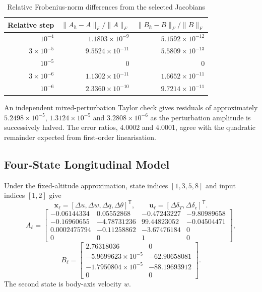 \documentclass[a4paper,11pt]{article}
\newcommand{\de}{\delta_e}
\newcommand{\dt}{\delta_T}
\begin{document}
\begin{table}[H]\centering
\caption{Relative Frobenius-norm differences from the selected Jacobians}
\begin{tabular}{rrr}\toprule
Relative step&$\|A_h-A\|_F/\|A\|_F$&$\|B_h-B\|_F/\|B\|_F$\\\midrule
$10^{-4}$&$1.1803\times10^{-9}$&$5.1592\times10^{-12}$\\
$3\times10^{-5}$&$9.5524\times10^{-11}$&$5.5809\times10^{-13}$\\
$10^{-5}$&$0$&$0$\\
$3\times10^{-6}$&$1.1302\times10^{-11}$&$1.6652\times10^{-11}$\\
$10^{-6}$&$2.3360\times10^{-10}$&$9.7214\times10^{-11}$\\\bottomrule
\end{tabular}
\end{table}
An independent mixed-perturbation Taylor check gives residuals of approximately $5.2498\times10^{-5}$, $1.3124\times10^{-5}$ and $3.2808\times10^{-6}$ as the perturbation amplitude is successively halved. The error ratios, 4.0002 and 4.0001, agree with the quadratic remainder expected from first-order linearisation.

\subsection{Four-State Longitudinal Model}
Under the fixed-altitude approximation, state indices $[1,3,5,8]$ and input indices $[1,2]$ give
\begin{equation}
\bm x_\ell=[\Delta u,\Delta w,\Delta q,\Delta\theta]^{\mathsf T},\qquad
\bm u_\ell=[\Delta\dt,\Delta\de]^{\mathsf T}.
\end{equation}
\begin{equation}\label{eq:alon}
A_\ell=\begin{bmatrix}
-0.06144334&0.05552868&-0.47243227&-9.80989658\\
-0.16960655&-4.78731236&99.44823052&-0.04504471\\
0.0002475794&-0.11258862&-3.67476184&0\\
0&0&1&0
\end{bmatrix},
\end{equation}
\begin{equation}\label{eq:blon}
B_\ell=\begin{bmatrix}
2.76318036&0\\
-5.9699623\times10^{-5}&-62.90658081\\
-1.7950804\times10^{-5}&-88.19693912\\
0&0
\end{bmatrix}.
\end{equation}
The second state is body-axis velocity $w$.
\end{document}
